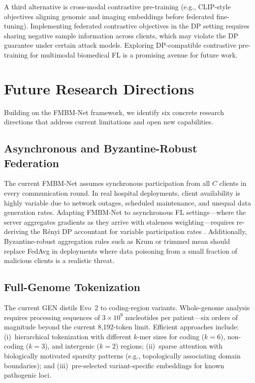 \documentclass{ieeeaccess}
\begin{document}
A third alternative is cross-modal contrastive pre-training (e.g., CLIP-style
objectives aligning genomic and imaging embeddings before federated fine-tuning).
Implementing federated contrastive objectives in the DP setting requires
sharing negative sample information across clients, which may violate the DP
guarantee under certain attack models. Exploring DP-compatible contrastive
pre-training for multimodal biomedical FL is a promising avenue for future work.



\section{Future Research Directions}
\label{sec:future}

Building on the FMBM-Net framework, we identify six concrete research directions
that address current limitations and open new capabilities.

\subsection{Asynchronous and Byzantine-Robust Federation}

The current FMBM-Net assumes synchronous participation from all $C$ clients
in every communication round. In real hospital deployments, client availability
is highly variable due to network outages, scheduled maintenance, and unequal
data generation rates. Adapting FMBM-Net to asynchronous FL settings---where
the server aggregates gradients as they arrive with staleness weighting---requires
re-deriving the R\'{e}nyi DP accountant for variable participation rates
\cite{mironov2017renyi}. Additionally, Byzantine-robust aggregation rules
such as Krum or trimmed mean should replace FedAvg in deployments where
data poisoning from a small fraction of malicious clients is a realistic threat.

\subsection{Full-Genome Tokenization}

The current GEN distils Evo~2 \cite{evo2_2026} to coding-region variants.
Whole-genome analysis requires processing sequences of $3\!\times\!10^9$
nucleotides per patient---six orders of magnitude beyond the current 8,192-token
limit. Efficient approaches include: (i)~hierarchical tokenization with
different $k$-mer sizes for coding ($k\!=\!6$), non-coding ($k\!=\!3$), and
intergenic ($k\!=\!2$) regions; (ii)~sparse attention with biologically
motivated sparsity patterns (e.g., topologically associating domain boundaries);
and (iii)~pre-selected variant-specific embeddings for known pathogenic loci.
\end{document}
